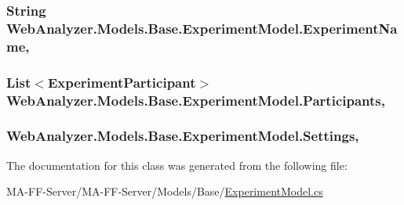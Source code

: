 \subsubsection[{Experiment\+Name}]{\setlength{\rightskip}{0pt plus 5cm}String Web\+Analyzer.\+Models.\+Base.\+Experiment\+Model.\+Experiment\+Name\hspace{0.3cm}{\ttfamily [get]}, {\ttfamily [set]}}\label{class_web_analyzer_1_1_models_1_1_base_1_1_experiment_model_ac638be077683d6707e49ca4ae481a0b1}
\hypertarget{class_web_analyzer_1_1_models_1_1_base_1_1_experiment_model_a2429c903e1bd2b062452cfa648238380}{}
\subsubsection[{Participants}]{\setlength{\rightskip}{0pt plus 5cm}List$<${\bf Experiment\+Participant}$>$ Web\+Analyzer.\+Models.\+Base.\+Experiment\+Model.\+Participants\hspace{0.3cm}{\ttfamily [get]}, {\ttfamily [set]}}\label{class_web_analyzer_1_1_models_1_1_base_1_1_experiment_model_a2429c903e1bd2b062452cfa648238380}
\hypertarget{class_web_analyzer_1_1_models_1_1_base_1_1_experiment_model_a00e6e2b80147ab73fc0eee0e7c20d856}{}
\subsubsection[{Settings}]{ Web\+Analyzer.\+Models.\+Base.\+Experiment\+Model.\+Settings\hspace{0.3cm}{\ttfamily [get]}, {\ttfamily [set]}}\label{class_web_analyzer_1_1_models_1_1_base_1_1_experiment_model_a00e6e2b80147ab73fc0eee0e7c20d856}


The documentation for this class was generated from the following file\+:\begin{DoxyCompactItemize}
\item 
M\+A-\/\+F\+F-\/\+Server/\+M\+A-\/\+F\+F-\/\+Server/\+Models/\+Base/\hyperlink{_experiment_model_8cs}{Experiment\+Model.\+cs}\end{DoxyCompactItemize}
